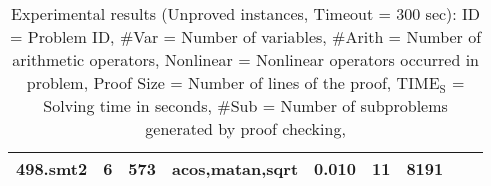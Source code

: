 \begin{table}
\begin{center}
\begin{tabular}{|l||r|r|r||r|r|r|r|r|}
\hline
498.smt2 & 6 & 573 & acos,matan,sqrt & 0.010 & 11 & 8191 \\
\hline
\end{tabular}
  \end{center}
  \caption{
    Experimental results (Unproved instances, Timeout = 300 sec):
    ID = Problem ID,
    \#Var = Number of variables,
    \#Arith = Number of arithmetic operators,
    Nonlinear = Nonlinear operators occurred in problem,
    Proof Size = Number of lines of the proof,
    $\mathrm{TIME_S}$ = Solving time in seconds,
    \#Sub = Number of subproblems generated by proof checking,
  }\label{tbl:exp}
\end{table}

